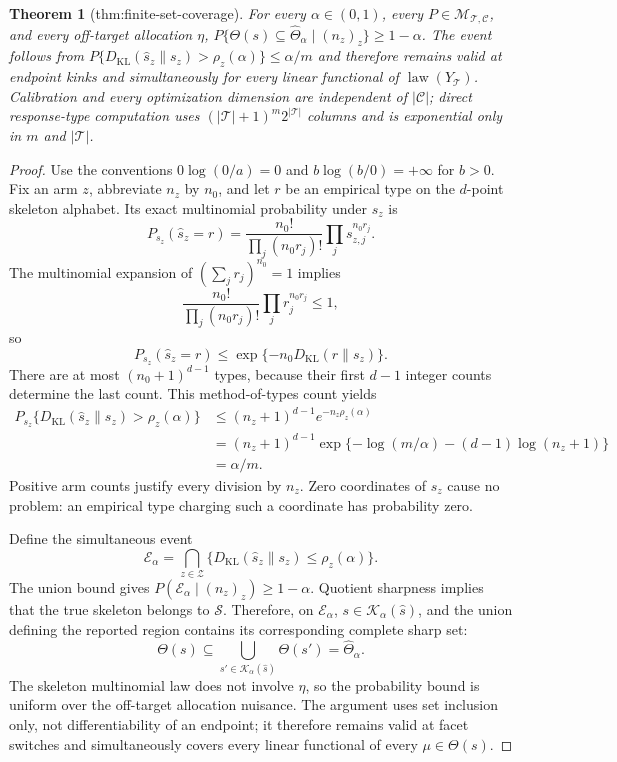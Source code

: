 \documentclass{article}
\newtheorem{theorem}{Theorem}
\begin{document}
\begin{theorem}[thm:finite-set-coverage]\label{thm:finite-set-coverage}
For every \(\alpha\in(0,1)\), every \(P\in\mathcal M_{\mathcal T,\mathcal C}\), and every off-target allocation \(\eta\), \(P\{\Theta(s)\subseteq\widehat\Theta_\alpha\mid(n_z)_z\}\ge1-\alpha\). The event follows from \(P\{D_{\mathrm{KL}}(\widehat s_z\|s_z)>\rho_z(\alpha)\}\le\alpha/m\) and therefore remains valid at endpoint kinks and simultaneously for every linear functional of \(\operatorname{law}(Y_{\mathcal T})\). Calibration and every optimization dimension are independent of \(|\mathcal C|\); direct response-type computation uses \((|\mathcal T|+1)^m2^{|\mathcal T|}\) columns and is exponential only in \(m\) and \(|\mathcal T|\).
\end{theorem}
\begin{proof}
Use the conventions \(0\log(0/a)=0\) and \(b\log(b/0)=+\infty\) for \(b>0\).  Fix an arm \(z\), abbreviate \(n_z\) by \(n_0\), and let \(r\) be an empirical type on the \(d\)-point skeleton alphabet.  Its exact multinomial probability under \(s_z\) is
\[
P_{s_z}(\widehat s_z=r)
=\frac{n_0!}{\prod_j(n_0r_j)!}\prod_js_{z,j}^{n_0r_j}.
\]
The multinomial expansion of \((\sum_jr_j)^{n_0}=1\) implies
\[
\frac{n_0!}{\prod_j(n_0r_j)!}\prod_jr_j^{n_0r_j}\le1,
\]
so
\[
P_{s_z}(\widehat s_z=r)
\le \exp\{-n_0D_{\mathrm{KL}}(r\|s_z)\}.
\]
There are at most \((n_0+1)^{d-1}\) types, because their first \(d-1\) integer counts determine the last count.  This method-of-types count yields
\[
\begin{aligned}
P_{s_z}\{D_{\mathrm{KL}}(\widehat s_z\|s_z)>\rho_z(\alpha)\}
&\le(n_z+1)^{d-1}e^{-n_z\rho_z(\alpha)}\\
&=(n_z+1)^{d-1}
\exp\{-\log(m/\alpha)-(d-1)\log(n_z+1)\}\\
&=\alpha/m.
\end{aligned}
\]
Positive arm counts justify every division by \(n_z\).  Zero coordinates of \(s_z\) cause no problem: an empirical type charging such a coordinate has probability zero.

Define the simultaneous event
\[
\mathcal E_\alpha=
\bigcap_{z\in\mathcal Z}
\{D_{\mathrm{KL}}(\widehat s_z\|s_z)\le\rho_z(\alpha)\}.
\]
The union bound gives \(P(\mathcal E_\alpha\mid(n_z)_z)\ge1-\alpha\).  Quotient sharpness implies that the true skeleton belongs to \(\mathcal S\).  Therefore, on \(\mathcal E_\alpha\), \(s\in\mathcal K_\alpha(\widehat s)\), and the union defining the reported region contains its corresponding complete sharp set:
\[
\Theta(s)\subseteq
\bigcup_{s'\in\mathcal K_\alpha(\widehat s)}\Theta(s')
=\widehat\Theta_\alpha.
\]
The skeleton multinomial law does not involve \(\eta\), so the probability bound is uniform over the off-target allocation nuisance.  The argument uses set inclusion only, not differentiability of an endpoint; it therefore remains valid at facet switches and simultaneously covers every linear functional of every \(\mu\in\Theta(s)\).


\end{proof}
\end{document}
